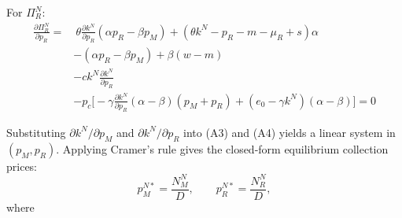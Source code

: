 \documentclass[authoryear,preprint,review,times,10pt]{elsarticle}
\begin{document}
For $\Pi_R^N$:
\begin{equation}
\begin{aligned}
\frac{\partial \Pi_R^N}{\partial p_R} =&\ \theta\frac{\partial k^N}{\partial p_R}(\alpha p_R - \beta p_M) + (\theta k^N - p_R - m - \mu_R + s)\alpha \\
&- (\alpha p_R - \beta p_M) + \beta(w - m) \\
& - c k^N \frac{\partial k^N}{\partial p_R} \\
& - p_c\Big[-\gamma\frac{\partial k^N}{\partial p_R}(\alpha - \beta)(p_M + p_R) + (e_0 - \gamma k^N)(\alpha - \beta)\Big] = 0
\end{aligned}
\tag{A4}
\end{equation}

Substituting $\partial k^N/\partial p_M$ and $\partial k^N/\partial p_R$ into (A3) and (A4) yields a linear system in $(p_M, p_R)$. Applying Cramer's rule gives the closed-form equilibrium collection prices:
\begin{equation}
p_M^{N*} = \frac{N_M^{N}}{D}, \qquad p_R^{N*} = \frac{N_R^{N}}{D},
\tag{A5}
\end{equation}
where
\end{document}
